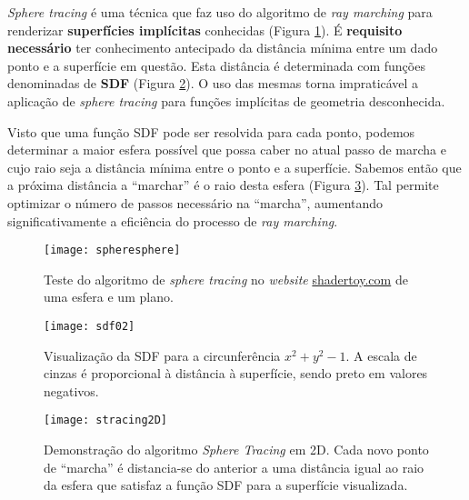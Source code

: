 \textit{Sphere tracing} é uma técnica que faz uso do algoritmo de \textit{ray marching} para renderizar \textbf{superfícies implícitas} conhecidas (Figura \ref{fig::spheresphere}). É \textbf{requisito necessário} ter conhecimento antecipado da distância mínima entre um dado ponto e a superfície em questão. Esta distância é determinada com funções denominadas de \textbf{\ac{SDF}} (Figura \ref{fig::sdf}). O uso das mesmas torna impraticável a aplicação de \textit{sphere tracing} para funções implícitas de geometria desconhecida.

Visto que uma função \acs{SDF} pode ser resolvida para cada ponto, podemos determinar a maior esfera possível que possa caber no atual passo de marcha e cujo raio seja a distância mínima entre o ponto e a superfície. Sabemos então que a próxima distância a ``marchar'' é o raio desta esfera (Figura \ref{fig::stracing2D}). Tal permite optimizar o número de passos necessário na ``marcha'', aumentando significativamente a eficiência do processo de \textit{ray marching}.


\begin{figure}[!htbp]
	\centering
	\texttt{[image: spheresphere]}
	\caption[Teste do algoritmo de \textit{sphere tracing}]{Teste do algoritmo de \textit{sphere tracing} no \textit{website} \url{shadertoy.com} de uma esfera e um plano.}
	\label{fig::spheresphere}
\end{figure}

\begin{figure}[!htbp]
	\centering
	\texttt{[image: sdf02]}
	\caption[\acs{SDF} para a circunferência $x^2 + y^2 - 1$]{Visualização da \acf{SDF} para a circunferência $x^2 + y^2 - 1$. A escala de cinzas é proporcional à distância à superfície, sendo preto em valores negativos.}
	\label{fig::sdf}
\end{figure}

\begin{figure}[!htbp]
	\centering
	\texttt{[image: stracing2D]}
	\caption[Algoritmo de \textit{Sphere Tracing} em 2D]{Demonstração do algoritmo \textit{Sphere Tracing} em 2D. Cada novo ponto de ``marcha'' é distancia-se do anterior a uma distância igual ao raio da esfera que satisfaz a função \acs{SDF} para a superfície visualizada.}
	\label{fig::stracing2D}
\end{figure}


